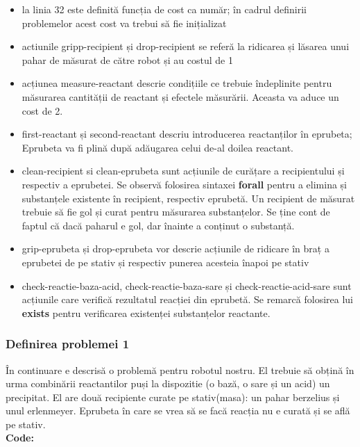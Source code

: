 \begin{itemize}
    \item la linia 32 este definită funcția de cost ca număr; în cadrul definirii problemelor acest cost va trebui să fie inițializat
    \item actiunile gripp-recipient și drop-recipient se referă la ridicarea și lăsarea unui pahar de măsurat de către robot și au costul de 1
    \item acțiunea measure-reactant descrie condițiile ce trebuie îndeplinite pentru măsurarea cantității de reactant și efectele măsurării. Aceasta va aduce un cost de 2.
    \item first-reactant și second-reactant descriu introducerea reactanților în eprubeta; Eprubeta va fi plină după adăugarea celui de-al doilea reactant.
    \item clean-recipient si clean-eprubeta sunt acțiunile de curățare a recipientului și respectiv a eprubetei. Se observă folosirea sintaxei \textbf{forall} pentru a elimina și substanțele existente în recipient, respectiv eprubetă. Un recipient de măsurat trebuie să fie gol și curat pentru măsurarea substanțelor. Se ține cont de faptul că dacă paharul e gol, dar înainte a conținut o substanță.
    \item grip-eprubeta și drop-eprubeta vor descrie acțiunile de ridicare în braț a eprubetei de pe stativ și respectiv punerea acesteia înapoi pe stativ
    \item check-reactie-baza-acid, check-reactie-baza-sare și check-reactie-acid-sare sunt acțiunile care verifică rezultatul reacției din eprubetă. Se remarcă folosirea lui \textbf{exists} pentru verificarea existenței substanțelor reactante.
    
    

\end{itemize}
\vspace{0.75cm}
\subsubsection{Definirea problemei 1}
    În continuare e descrisă o problemă pentru robotul nostru. El trebuie să obțină în urma combinării reactantilor puși la dispozitie (o bază, o sare și un acid) un precipitat.  El are două recipiente curate pe stativ(masa): un pahar berzelius și unul erlenmeyer. Eprubeta în care se vrea să se facă reacția nu e curată și se află pe stativ. \\\newline
\textbf{Code:}
\inputminted[linenos]{python}{code/ClassicPDDL/problemrob.pddl}


